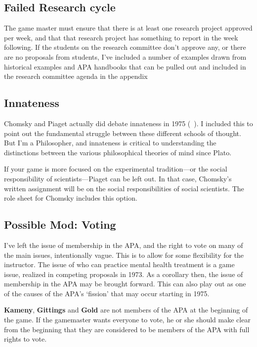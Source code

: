 \begin{refsection}
\subsection{Failed Research cycle}
\label{failedresearchcycle}

The game master must ensure that there is at least one research project approved per week, and that that research project has something to report in the week following. If the students on the research committee don’t approve any, or there are no proposals from students, I’ve included a number of examples drawn from historical examples and APA handbooks that can be pulled out and included in the research committee agenda in the appendix 

\subsection{Innateness}
\label{innateness}

Chomsky and Piaget actually did debate innateness in 1975 (~\citep{PiatelliPalmarini:LHbFI2mG}). I included this to point out the fundamental struggle between these different schools of thought. But I’m a Philosopher, and innateness is critical to understanding the distinctions between the various philosophical theories of mind since Plato.

If your game is more focused on the experimental tradition---or the social responsibility of scientists---Piaget can be left out. In that case, Chomsky’s written assignment will be on the social responsibilities of social scientists. The role sheet for Chomsky includes this option.

\subsection{Possible Mod: Voting}
\label{possiblemod:voting}

I've left the issue of membership in the APA, and the right to vote on many of the main issues, intentionally vague. This is to allow for some flexibility for the instructor. The issue of who can practice mental health treatment is a game issue, realized in competing proposals in 1973. As a corollary then, the issue of membership in the APA may be brought forward. This can also play out as one of the causes of the APA’s ‘fission' that may occur starting in 1975.

\textbf{Kameny}, \textbf{Gittings} and \textbf{Gold} are not members of the APA at the beginning of the game. If the gamemaster wants everyone to vote, he or she should make clear from the beginning that they are considered to be members of the APA with full rights to vote. 


\end{refsection}
